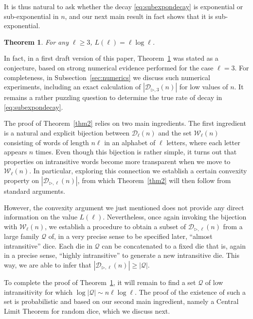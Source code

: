\documentclass[reqno,a4paper,11pt]{amsart}
\newcommand{\btt}{\triangleright}
\newtheorem{theorem}[lemma]{Theorem}
\theoremstyle{remark}
\newcommand{\mc}[1]{{\mathcal #1}}
\newcommand{\Gs}[1]{\mbox{}\marginpar{\tiny\raggedright\hspace{0pt}{{\bf G:} {\color{violet}#1}}}}
\numberwithin{equation}{section}
\begin{document}
It is thus natural to ask whether the decay \eqref{eq:subexpondecay} is exponential or sub-exponential in $n$, and our next main result in fact shows that it is sub-exponential.

\begin{theorem}\label{thm:ellvalue}
For any $\ell\geq 3$, $L(\ell)=\ell\log \ell$.
\end{theorem}

In fact, in a first draft version of this paper, Theorem~\ref{thm:ellvalue} was stated as a conjecture, based on strong numerical evidence performed for the case $\ell=3$. For completeness, in Subsection~\ref{sec:numerics} we discuss such numerical experiments, including an exact calculation of $|\mc D_{\btt,3}(n)|$ for low values of $n$. It remains a rather puzzling question to determine the true rate of decay in \eqref{eq:subexpondecay}.

The proof of Theorem~\ref{thm2} relies on two main ingredients. The first ingredient is a natural and explicit bijection between $\mc D_\ell(n)$ and the set $\mc W_\ell(n)$ consisting of words of length $n\ell$ in an alphabet of $\ell$ letters, where each letter appears $n$ times. Even though this bijection is rather simple, it turns out that properties on intransitive words become more transparent when we move to $\mc W_\ell(n)$. In particular, exploring this connection we establish a certain convexity property on $|\mc D_{\btt,\ell}(n)|$, from which Theorem~\ref{thm2} will then follow from standard arguments. 

However, the convexity argument we just mentioned does not provide any direct information on the value $L(\ell)$. Nevertheless, once again invoking the bijection with $\mc W_\ell(n)$, we establish a procedure to obtain a subset of $\mc D_{\btt, \ell}(n)$ from a large family $\mc Q$ of, in a very precise sense to be specified later, ``almost intransitive'' dice. Each die in $\mc Q$ can be concatenated to a fixed die that is, again in a precise sense, ``highly intransitive'' to generate a new intransitive die. This way, we are able to infer that $|\mc D_{\btt,\ell}(n)|\geq |\mc Q|$.

To complete the proof of Theorem~\ref{thm:ellvalue}, it will remain to find a set $\mc Q$ of low intransitivity for which $\log |\mc Q| \sim {n\ell\log\ell}$. The proof of the existence of such a set is probabilistic and based on our second main ingredient, namely a Central Limit Theorem for random dice, which we discuss next.


\end{document}
